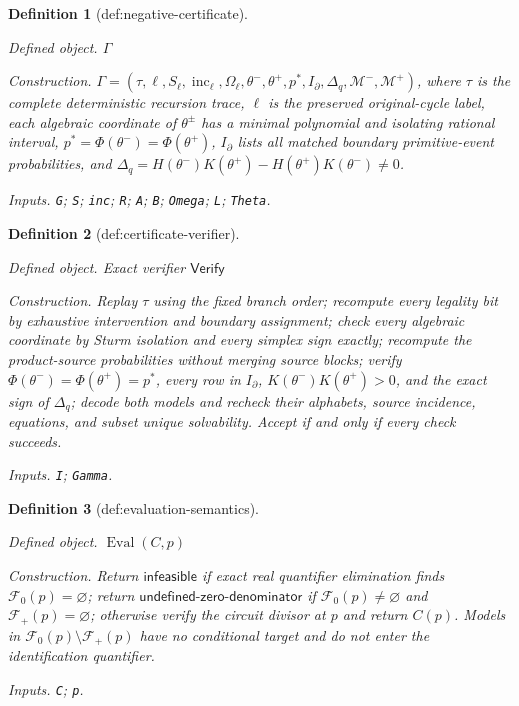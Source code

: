 \documentclass{article}
\newtheorem{definition}{Definition}
\begin{document}
\begin{definition}[def:negative-certificate]\label{def:negative-certificate}
\par\smallskip\noindent\emph{Defined object.} \(\Gamma\)
\par\smallskip\noindent\emph{Construction.} \(\Gamma=(\tau,\ell,S_\ell,\operatorname{inc}_\ell,\Omega_\ell,\theta^-,\theta^+,p^*,I_{\partial},\Delta_q,\mathcal M^-,\mathcal M^+)\), where \(\tau\) is the complete deterministic recursion trace, \(\ell\) is the preserved original-cycle label, each algebraic coordinate of \(\theta^\pm\) has a minimal polynomial and isolating rational interval, \(p^*=\Phi(\theta^-)=\Phi(\theta^+)\), \(I_{\partial}\) lists all matched boundary primitive-event probabilities, and \(\Delta_q=H(\theta^-)K(\theta^+)-H(\theta^+)K(\theta^-)\ne0\).
\par\smallskip\noindent\emph{Inputs.} \texttt{G}; \texttt{S}; \texttt{inc}; \texttt{R}; \texttt{A}; \texttt{B}; \texttt{Omega}; \texttt{L}; \texttt{Theta}.
\end{definition}

\begin{definition}[def:certificate-verifier]\label{def:certificate-verifier}
\par\smallskip\noindent\emph{Defined object.} Exact verifier \(\mathsf{Verify}\)
\par\smallskip\noindent\emph{Construction.} Replay \(\tau\) using the fixed branch order; recompute every legality bit by exhaustive intervention and boundary assignment; check every algebraic coordinate by Sturm isolation and every simplex sign exactly; recompute the product-source probabilities without merging source blocks; verify \(\Phi(\theta^-)=\Phi(\theta^+)=p^*\), every row in \(I_{\partial}\), \(K(\theta^-)K(\theta^+)>0\), and the exact sign of \(\Delta_q\); decode both models and recheck their alphabets, source incidence, equations, and subset unique solvability. Accept if and only if every check succeeds.
\par\smallskip\noindent\emph{Inputs.} \texttt{I}; \texttt{Gamma}.
\end{definition}

\begin{definition}[def:evaluation-semantics]\label{def:evaluation-semantics}
\par\smallskip\noindent\emph{Defined object.} \(\operatorname{Eval}(C,p)\)
\par\smallskip\noindent\emph{Construction.} Return \(\mathsf{infeasible}\) if exact real quantifier elimination finds \(\mathcal F_0(p)=\varnothing\); return \(\mathsf{undefined\mbox{-}zero\mbox{-}denominator}\) if \(\mathcal F_0(p)\ne\varnothing\) and \(\mathcal F_+(p)=\varnothing\); otherwise verify the circuit divisor at \(p\) and return \(C(p)\). Models in \(\mathcal F_0(p)\setminus\mathcal F_+(p)\) have no conditional target and do not enter the identification quantifier.
\par\smallskip\noindent\emph{Inputs.} \texttt{C}; \texttt{p}.
\end{definition}
\end{document}
